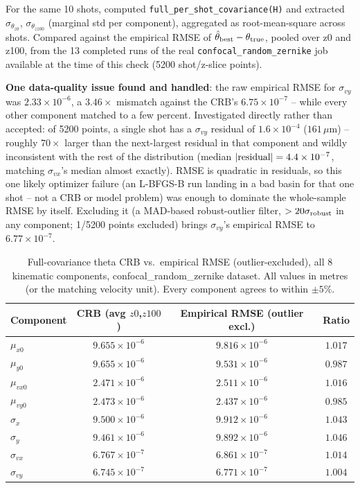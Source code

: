 \documentclass[11pt,a4paper]{article}
\newcommand{\code}[1]{\texttt{#1}}
\begin{document}
For the same 10 shots, computed \code{full\_per\_shot\_covariance(H)} and
extracted $\sigma_{\theta_{z0}}$, $\sigma_{\theta_{z100}}$ (marginal std per
component), aggregated as root-mean-square across shots. Compared against
the empirical RMSE of $\hat\theta_{\rm best}-\theta_{\rm true}$, pooled over
z0 and z100, from the 13 completed runs of the real
\code{confocal\_random\_zernike} job available at the time of this check
(5200 shot/z-slice points).

\textbf{One data-quality issue found and handled}: the raw empirical RMSE
for $\sigma_{vy}$ was $2.33\times10^{-6}$, a $3.46\times$ mismatch against
the CRB's $6.75\times10^{-7}$ -- while every other component matched to a
few percent. Investigated directly rather than accepted: of 5200 points, a
single shot has a $\sigma_{vy}$ residual of $1.6\times10^{-4}$ ($161\,\mu$m)
-- roughly $70\times$ larger than the next-largest residual in that
component and wildly inconsistent with the rest of the distribution (median
$|{\rm residual}|=4.4\times10^{-7}$, matching $\sigma_{vx}$'s median almost
exactly). RMSE is quadratic in residuals, so this one likely optimizer
failure (an L-BFGS-B run landing in a bad basin for that one shot -- not a
CRB or model problem) was enough to dominate the whole-sample RMSE by
itself. Excluding it (a MAD-based robust-outlier filter, $>20\sigma_{\rm
robust}$ in any component; 1/5200 points excluded) brings $\sigma_{vy}$'s
empirical RMSE to $6.77\times10^{-7}$.

\begin{table}[h]
\centering
\begin{tabular}{lccc}
\toprule
Component & CRB (avg $z0$,$z100$) & Empirical RMSE (outlier excl.) & Ratio \\
\midrule
$\mu_{x0}$      & $9.655\times10^{-6}$ & $9.816\times10^{-6}$ & $1.017$ \\
$\mu_{y0}$      & $9.655\times10^{-6}$ & $9.531\times10^{-6}$ & $0.987$ \\
$\mu_{vx0}$     & $2.471\times10^{-6}$ & $2.511\times10^{-6}$ & $1.016$ \\
$\mu_{vy0}$     & $2.473\times10^{-6}$ & $2.437\times10^{-6}$ & $0.985$ \\
$\sigma_x$      & $9.500\times10^{-6}$ & $9.912\times10^{-6}$ & $1.043$ \\
$\sigma_y$      & $9.461\times10^{-6}$ & $9.892\times10^{-6}$ & $1.046$ \\
$\sigma_{vx}$   & $6.767\times10^{-7}$ & $6.861\times10^{-7}$ & $1.014$ \\
$\sigma_{vy}$   & $6.745\times10^{-7}$ & $6.771\times10^{-7}$ & $1.004$ \\
\bottomrule
\end{tabular}
\caption{Full-covariance theta CRB vs.\ empirical RMSE (outlier-excluded),
all 8 kinematic components, confocal\_random\_zernike dataset. All values in
metres (or the matching velocity unit). Every component agrees to within
$\pm5\%$.}
\end{table}
\end{document}
